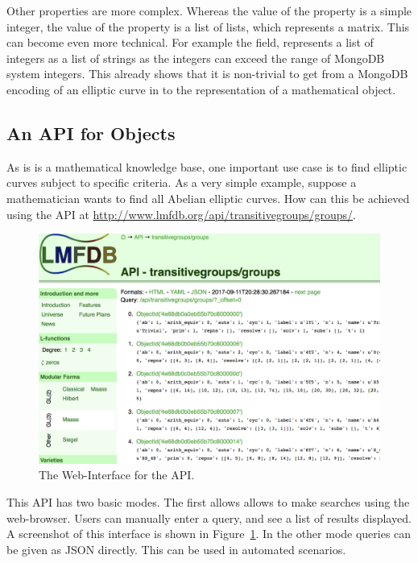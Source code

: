Other properties are more complex.
Whereas the value of the  property is a simple integer, the value of
the  property is a list of lists, which represents a matrix. 
This can become even more technical. 
For example the  field, \lmfdb represents
a list of integers as a list of strings as the integers can exceed the range of MongoDB system
integers.  This already shows that it is non-trivial to get from a MongoDB encoding of an elliptic
curve in \lmfdb to the representation of a mathematical object. 


\subsection{An API for  \lmfdb Objects}\label{sec:sota:api}

As \lmfdb is is a mathematical knowledge base, one important use case is to find elliptic
curves subject to specific criteria. As a very simple example, suppose a mathematician
wants to find all Abelian elliptic curves.  How can this be achieved using the \lmfdb API
at \url{http://www.lmfdb.org/api/transitivegroups/groups/}.
\begin{figure}[h]
  \begin{center}
    \includegraphics[width=\textwidth]{APIScreenshot.png}
  \end{center}

  \caption[The Web-Interface for the \lmfdb API. ]{
    The Web-Interface for the \lmfdb API. 
  }
  \label{fig:apiscreenshot}
\end{figure}

This API has two basic modes. The first allows allows to make searches using the
web-browser.  Users can manually enter a query, and see a list of results displayed.  A
screenshot of this interface is shown in Figure~\ref{fig:apiscreenshot}.  In the other
mode queries can be given as JSON directly.  This can be used in automated scenarios.

